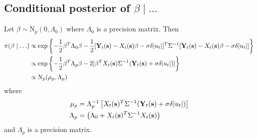 \subsection*{Conditional posterior of $\beta \mid \ldots$}\label{s:betapost}
Let $\beta \sim \mbox{N}_{p}(0, \Lambda_0)$ where $\Lambda_0$ is a precision matrix. Then 
\begin{align}
    \pi(\beta \mid \ldots) & \propto \exp \left\{ - \frac{ 1 }{ 2 } \beta^T \Lambda_0 \beta - \frac{ 1 }{ 2 } [\mbox{\bf Y}_t(\mbox{\bf s}) - X_t(\mbox{\bf s}) \beta - \sigma \delta |u_t|]^T \Sigma^{-1} [\mbox{\bf Y}_t(\mbox{\bf s}) - X_t(\mbox{\bf s}) \beta - \sigma \delta |u_t|] \right\} \nonumber \\
     & \propto \exp \left\{ -\frac{ 1 }{ 2 } \beta^T \Lambda_p \beta  - 2 [ \beta^T X_t(\mbox{\bf s}) \Sigma^{-1} (\mbox{\bf Y}_t(\mbox{\bf s}) + \sigma \delta |u_t| )]\right\} \nonumber \\
     & \propto \mbox{N}_p ( \mu_p , \Lambda_p)
\end{align}
where
\begin{align*}
    \mu_p &= \Lambda_p^{-1} \left[ X_t(\mbox{\bf s})^T \Sigma^{-1} (\mbox{\bf Y}_t(\mbox{\bf s}) + \sigma \delta | u_t |) \right]\\
    \Lambda_p &= \left (\Lambda_0 + X_t(\mbox{\bf s})^T \Sigma^{-1} X_t(\mbox{\bf s}) \right)
\end{align*}
and $\Lambda_p$ is a precision matrix.